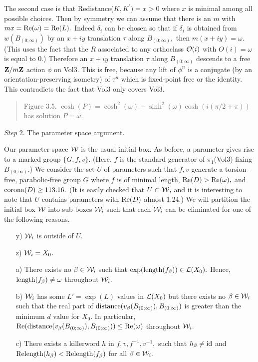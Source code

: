 The second case is that
Redistance($K, K^\prime) = x > 0$
where $x$ is minimal among all possible choices. 
Then by symmetry we can
assume that there is an $m$ with $mx={\rm Re}(\omega)={\rm Re}(L).$  Indeed $\delta_i$ can be
chosen so that if $\delta_i$ is obtained from $w(B_{(0;\infty)})$ by an $x+iy$ translation
$\tau$ along $ B_{(0;\infty)},$ then $m(x+iy)=\omega.$  (This uses the fact that the $R$
associated to any orthoclass ${\cal O}(i)$ with $O(i)=\omega$ is equal to $0.$)
Therefore  an $x+iy$ 
translation $\tau$ along $ B_{(0;\infty)}$ descends to a free ${\bf Z}/m{\bf Z}$ action $\phi$ on Vol3.  This is free, because any
lift of $\phi^n$ is a conjugate (by an orientation-preserving isometry) of $\tau^n$ which is fixed-point free or the identity.
This  contradicts the fact that Vol3 only covers Vol3.
\enddemo

\begin{quote} Figure 3.5. $\cosh(P) = 
\cosh^2(\omega) + \sinh^2(\omega) \cosh(i (\pi/2 + \pi))$ has solution $P = \bar \omega.$
\end{quote}


{\it Step} 2. The parameter space argument.
 

 Our parameter space ${\cal W}$ is the usual initial box.   As before, a parameter
gives rise to a marked group $\{G,f,v\}$.  (Here, $f$ is
the standard generator
of $\pi_1$(Vol3) fixing $ B_{(0;\infty)}$.)  We consider the 
set $U$ of parameters such that
$f, v$ generate a torsion-free, parabolic-free group $G$ where $f$ is of minimal length, 
${\rm Re}(D) > {\rm Re}(\omega),$ and
${\rm corona}(D) \ge 113.16.$
(It is easily checked that $U \subset {\cal W},$ and it is
interesting to note that $U$ contains parameters with ${\rm Re}(D)$ 
almost 1.24.)
We will partition the initial box ${\cal W}$ into sub-boxes ${\cal W}_i$ 
such that each ${\cal W}_i$ can be eliminated for one of
the following reasons.
\begin{itemize}
\item[y)]  ${\cal W}_i$ is outside of $U$.

\item[z)]  ${\cal W}_i = X_0.$

\item[a)]  There exists no $\beta\in {\cal W}_i$ such that 
$\exp({\rm length}(f_\beta)) \in {\cal L}(X_0).$  
Hence, ${\rm length}(f_\beta) \neq \omega$ throughout ${\cal W}_i.$

\item[b)]       ${\cal W}_i$ has some $L'=\exp(L)$ values in  ${\cal L}(X_0)$ but
there exists no $\beta\in {\cal W}_i$ such that the real part of 
${\rm distance}(v_\beta(B_{(0;\infty)}), B_{(0;\infty)})$ is greater than the minimum $d$ value for $X_0.$
In particular,  ${\rm Re(distance}(v_\beta(B_{(0;\infty)}), B_{(0;\infty)})) \le {\rm Re}(\omega)$ throughout ${\cal W}_i.$

\item[c)]  There exists a killerword $h$ in $f,v,f^{-1},v^{-1},$ such that
$h_\beta \neq {\rm id}$ and
${\rm Relength}(h_\beta) < {\rm Relength}(f_\beta)$  
for all $\beta\in {\cal W}_i.$
\end{itemize}
 
